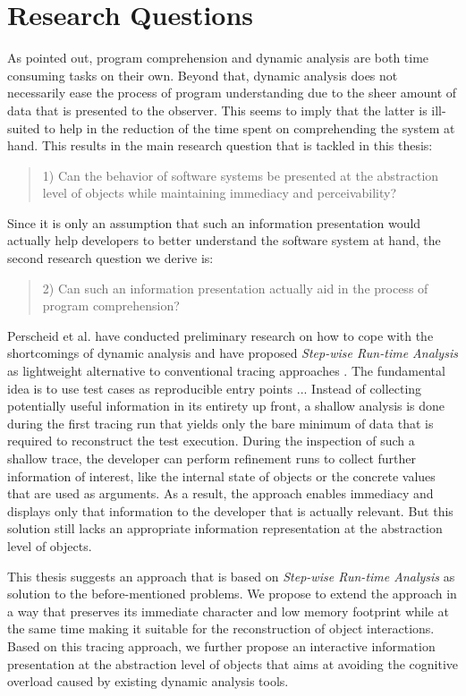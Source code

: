 \section{Research Questions}
As pointed out, program comprehension and dynamic analysis are both time consuming tasks on their own.
Beyond that, dynamic analysis does not necessarily ease the process of program understanding due to the sheer amount of data that is presented to the observer.
This seems to imply that the latter is ill-suited to help in the reduction of the time spent on comprehending the system at hand.
This results in the main research question that is tackled in this thesis:

\begin{quote}
1) Can the behavior of software systems be presented at the abstraction level of objects while maintaining immediacy and perceivability?
\end{quote}

Since it is only an assumption that such an information presentation would actually help developers to better understand the software system at hand, the second research question we derive is:

\begin{quote}
2) Can such an information presentation actually aid in the process of program comprehension?
\end{quote}

Perscheid et al. have conducted preliminary research on how to cope with the shortcomings of dynamic analysis and have proposed \emph{Step-wise Run-time Analysis} as lightweight alternative to conventional tracing approaches \cite{perscheid_immediacy_2010}.
The fundamental idea is to use test cases as reproducible entry points ...
Instead of collecting potentially useful information in its entirety up front, a shallow analysis is done during the first tracing run that yields only the bare minimum of data that is required to reconstruct the test execution.
During the inspection of such a shallow trace, the developer can perform refinement runs to collect further information of interest, like the internal state of objects or the concrete values that are used as arguments.
As a result, the approach enables immediacy and displays only that information to the developer that is actually relevant.
But this solution still lacks an appropriate information representation at the abstraction level of objects.

This thesis suggests an approach that is based on \emph{Step-wise Run-time Analysis} as solution to the before-mentioned problems. 
We propose to extend the approach in a way that preserves its immediate character and low memory footprint while at the same time making it suitable for the reconstruction of object interactions.
Based on this tracing approach, we further propose an interactive information presentation at the abstraction level of objects that aims at avoiding the cognitive overload caused by existing dynamic analysis tools.

